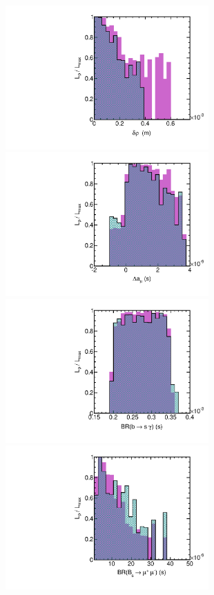 \begin{figure}[htbp]
\begin{center}
\includegraphics[height=5.5cm]{figs/fig_drho_m.pdf} 
\includegraphics[height=5.5cm]{figs/fig_muon_gm2_s.pdf} \\
\includegraphics[height=5.5cm]{figs/fig_bsgamma_s.pdf} 
\includegraphics[height=5.5cm]{figs/fig_Bsmumu_s.pdf} \\

\end{center}
\end{figure}
